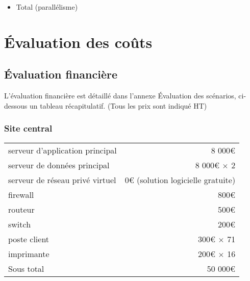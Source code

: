     \begin{itemize}        
        \item Total (parallélisme)
    \end{itemize}

\section{Évaluation des coûts}

    \subsection{Évaluation financière}
    
        L'évaluation financière est détaillé dans l'annexe Évaluation des scénarios, ci-dessous un tableau récapitulatif.
        (Tous les prix sont indiqué HT)
    
        \subsubsection{Site central}
            \begin{tabular*}{\textwidth}{ l @{\extracolsep{\fill}} r }
	            serveur d'application principal   & 8 000€ \\ 
	            serveur de données principal      & 8 000€ $\times$ 2 \\ 
	            serveur de réseau privé virtuel   & 0€ (solution logicielle gratuite)\\ 
                firewall                          & 800€ \\ 
	            routeur                           & 500€ \\ 
	            switch                            & 200€ \\ 
	            poste client                      & 300€ $\times$ 71\\
	            imprimante                        & 200€ $\times$ 16\\ \hline
	            Sous total                        & 50 000€
            \end{tabular*}
            
